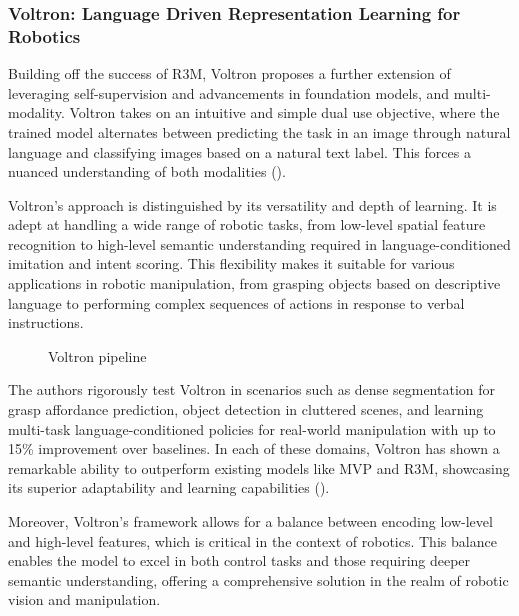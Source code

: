 \documentclass[
  letterpaper,
  numbers=noenddot,
  DIV=11]{scrreprt}
\theoremstyle{definition}
\theoremstyle{plain}
\theoremstyle{plain}
\theoremstyle{remark}
\begin{document}
\subsubsection*{Voltron: Language Driven Representation Learning for
Robotics}\label{voltron-language-driven-representation-learning-for-robotics}

Building off the success of R3M, Voltron proposes a further extension of
leveraging self-supervision and advancements in foundation models, and
multi-modality. Voltron takes on an intuitive and simple dual use
objective, where the trained model alternates between predicting the
task in an image through natural language and classifying images based
on a natural text label. This forces a nuanced understanding of both
modalities ().

Voltron's approach is distinguished by its versatility and depth of
learning. It is adept at handling a wide range of robotic tasks, from
low-level spatial feature recognition to high-level semantic
understanding required in language-conditioned imitation and intent
scoring. This flexibility makes it suitable for various applications in
robotic manipulation, from grasping objects based on descriptive
language to performing complex sequences of actions in response to
verbal instructions.

\begin{figure}


\caption{\label{fig-voltron-pipeline}Voltron pipeline}

\end{figure}%

The authors rigorously test Voltron in scenarios such as dense
segmentation for grasp affordance prediction, object detection in
cluttered scenes, and learning multi-task language-conditioned policies
for real-world manipulation with up to 15\% improvement over baselines.
In each of these domains, Voltron has shown a remarkable ability to
outperform existing models like MVP and R3M, showcasing its superior
adaptability and learning capabilities
().

Moreover, Voltron's framework allows for a balance between encoding
low-level and high-level features, which is critical in the context of
robotics. This balance enables the model to excel in both control tasks
and those requiring deeper semantic understanding, offering a
comprehensive solution in the realm of robotic vision and manipulation.
\end{document}
